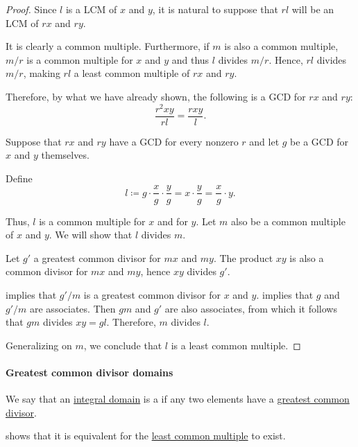 \begin{proof}
   Since \( l \) is a LCM of \( x \) and \( y \), it is natural to suppose that \( rl \) will be an LCM of \( rx \) and \( ry \).

  It is clearly a common multiple. Furthermore, if \( m \) is also a common multiple, \( m / r \) is a common multiple for \( x \) and \( y \) and thus \( l \) divides \( m / r \). Hence, \( rl \) divides \( m / r \), making \( rl \) a least common multiple of \( rx \) and \( ry \).

  Therefore, by what we have already shown, the following is a GCD for \( rx \) and \( ry \):
  \begin{equation*}
    \frac {r^2 xy} {rl} = \frac {rxy} l.
  \end{equation*}

  \NecessitySubProof Suppose that \( rx \) and \( ry \) have a GCD for every nonzero \( r \) and let \( g \) be a GCD for \( x \) and \( y \) themselves.

  Define
  \begin{equation*}
    l \coloneqq g \cdot \frac x g \cdot \frac y g = x \cdot \frac y g = \frac x g \cdot y.
  \end{equation*}

  Thus, \( l \) is a common multiple for \( x \) and for \( y \). Let \( m \) also be a common multiple of \( x \) and \( y \). We will show that \( l \) divides \( m \).

  Let \( g' \) a greatest common divisor for \( mx \) and \( my \). The product \( xy \) is also a common divisor for \( mx \) and \( my \), hence \( xy \) divides \( g' \).

   implies that \( g' / m \) is a greatest common divisor for \( x \) and \( y \).  implies that \( g \) and \( g' / m \) are associates. Then \( gm \) and \( g' \) are also associates, from which it follows that \( gm \) divides \( xy = gl \). Therefore, \( m \) divides \( l \).

  Generalizing on \( m \), we conclude that \( l \) is a least common multiple.
\end{proof}

\paragraph{Greatest common divisor domains}

\begin{definition}\label{def:gcd_domain}
  We say that an \hyperref[def:integral_domain]{integral domain} is a  if any two elements have a \hyperref[def:gcd]{greatest common divisor}.

   shows that it is equivalent for the \hyperref[def:lcm]{least common multiple} to exist.
\end{definition}

